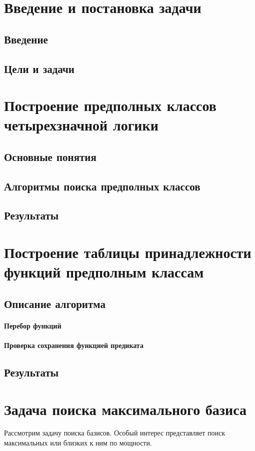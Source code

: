 \documentclass[a4paper,14pt]{extreport}
\begin{document}
\newpage
\tableofcontents
\newpage
\chapter{ Введение и постановка задачи }

\section{Введение}
\section{Цели и задачи}
 
\newpage
\chapter{Построение предполных классов четырехзначной логики}
\section{Основные понятия}
\section{Алгоритмы поиска предполных классов}
\section{Результаты}

\newpage
\chapter{Построение таблицы принадлежности функций предполным классам}
\section{Описание алгоритма}
\subsubsection{Перебор функций}
\subsubsection{Проверка сохранения функцией предиката}
\section{Результаты}

\newpage
\chapter{Задача поиска максимального базиса}
Рассмотрим задачу поиска базисов. Особый интерес представляет поиск максимальных или близких к ним по мощности. 
\end{document}
